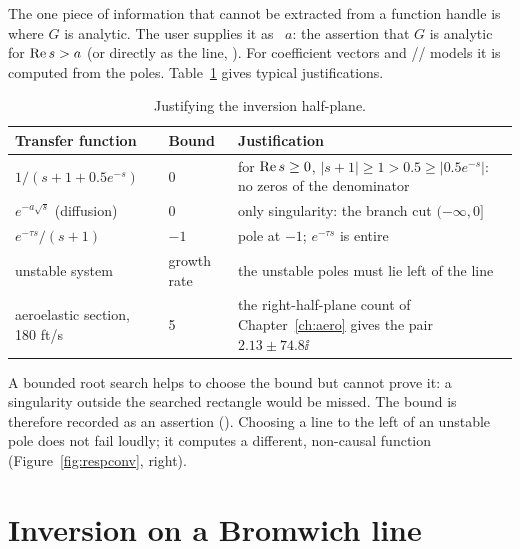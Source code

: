 The one piece of information that cannot be extracted from a function
handle is where $G$ is analytic. The user supplies it as
~$a$: the assertion that $G$ is analytic for
$\operatorname{Re} s>a$ (or directly as the line, ). For coefficient
vectors and // models it is computed from the
poles. Table~\ref{tab:bounds} gives typical justifications.

\begin{table}[H]\centering\small
\caption{Justifying the inversion half-plane.}\label{tab:bounds}
\begin{tabularx}{\textwidth}{>{\raggedright}p{4.2cm}p{1.1cm}X}
\toprule
Transfer function & Bound & Justification\\\midrule
$1/(s+1+0.5e^{-s})$ & 0 & for $\operatorname{Re} s\ge0$, $|s+1|\ge1>0.5\ge|0.5e^{-s}|$: no zeros of the denominator\\
$e^{-a\sqrt s}$ (diffusion) & 0 & only singularity: the branch cut $(-\infty,0]$\\
$e^{-\tau s}/(s+1)$ & $-1$ & pole at $-1$; $e^{-\tau s}$ is entire\\
unstable system & growth rate & the unstable poles must lie left of the line\\
aeroelastic section, 180 ft/s & 5 & the right-half-plane count of Chapter~\ref{ch:aero} gives the pair $2.13\pm74.8\ii$\\
\bottomrule\end{tabularx}
\end{table}

A bounded root search helps to choose the bound but cannot prove it: a
singularity outside the searched rectangle would be missed. The bound is
therefore recorded as an assertion (). Choosing a
line to the left of an unstable pole does not fail loudly; it computes a
different, non-causal function (Figure~\ref{fig:respconv}, right).

\section{Inversion on a Bromwich line}

